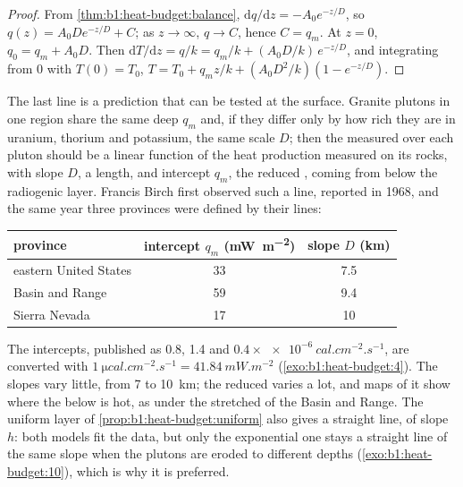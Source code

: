 \begin{proof}
From \cref{thm:b1:heat-budget:balance}, $\mathrm dq/\mathrm dz =
-A_0e^{-z/D}$, so $q(z) = A_0 D e^{-z/D} + C$; as $z \to \infty$, $q \to C$,
hence $C = q_m$. At $z = 0$, $q_0 = q_m + A_0 D$. Then $\mathrm dT/\mathrm dz =
q/k = q_m/k + (A_0D/k)\,e^{-z/D}$, and integrating from $0$ with $T(0) = T_0$,
$T = T_0 + q_m z/k + (A_0 D^2/k)(1 - e^{-z/D})$.
\end{proof}

The last line is a prediction that can be tested at the surface. Granite
plutons in one region share the same deep  $q_m$ and, if they differ
only by how rich they are in uranium, thorium and potassium, the same scale
$D$; then the  measured over each pluton should be a linear function
of the heat production measured on its rocks, with slope $D$, a length, and
intercept $q_m$, the reduced , coming from below the radiogenic
layer. Francis Birch first observed such a line, reported in 1968, and the
same year three provinces were defined by their lines:
\begin{center}
\small
\begin{tabular}{lcc}
\hline
province & intercept $q_m$ (\unit{mW.m^{-2}}) & slope $D$ (\unit{km}) \\
\hline
eastern United States & 33 & 7.5 \\
Basin and Range & 59 & 9.4 \\
Sierra Nevada & 17 & 10 \\
\hline
\end{tabular}
\end{center}
The intercepts, published as 0.8, 1.4 and $0.4\times\qty{e-6}{cal.cm^{-2}.s^{-1}}$,
are converted with $\qty{1}{\micro cal.cm^{-2}.s^{-1}} = \qty{41.84}{mW.m^{-2}}$
(\cref{exo:b1:heat-budget:4}). The slopes vary little, from 7 to \qty{10}{km}; the reduced  varies a lot, and maps of it show where the  below is hot, as under
the stretched  of the Basin and Range. The uniform layer of
\cref{prop:b1:heat-budget:uniform} also gives a straight line, of slope $h$:
both models fit the data, but only the exponential one stays a straight line
of the same slope when the plutons are eroded to different depths
(\cref{exo:b1:heat-budget:10}), which is why it is preferred.

